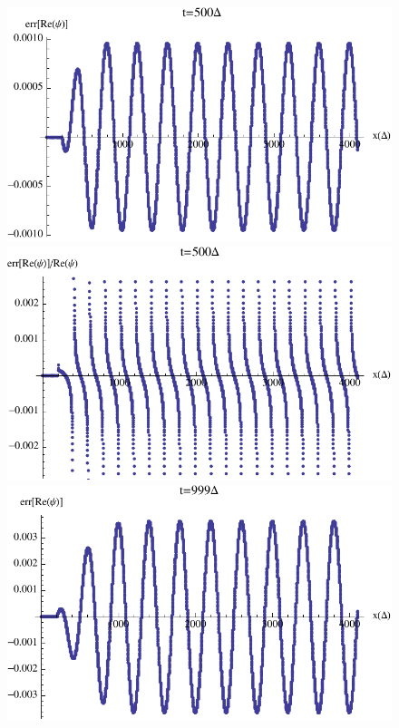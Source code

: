 \documentclass[final,1p,times]{elsarticle}
\begin{document}
\begin{figure}[htbp]
	\includegraphics[scale=0.5]{abs_error_t_500}
	\includegraphics[scale=0.5]{rel_error_t_500}\\
	\vspace{0.5cm}
	\includegraphics[scale=0.5]{abs_error_t_999}

\end{figure}
\end{document}
